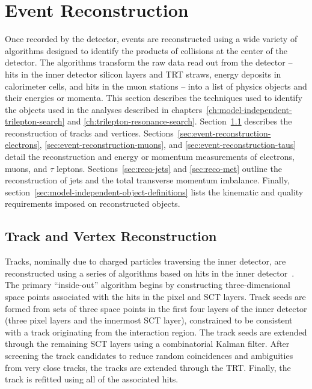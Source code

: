\chapter{Event Reconstruction}\label{ch:event-reconstruction}

Once recorded by the detector, events are reconstructed using a wide variety of algorithms designed to identify the products of collisions at the center of the detector. The algorithms transform the raw data read out from the detector -- hits in the inner detector silicon layers and TRT straws, energy deposits in calorimeter cells, and hits in the muon stations -- into a list of physics objects and their energies or momenta. This section describes the techniques used to identify the objects used in the analyses described in chapters~\ref{ch:model-independent-trilepton-search} and \ref{ch:trilepton-resonance-search}. Section~\ref{sec:event-reconstruction-track-vertex} describes the reconstruction of tracks and vertices. Sections~\ref{sec:event-reconstruction-electrons}, \ref{sec:event-reconstruction-muons}, and \ref{sec:event-reconstruction-taus} detail the reconstruction and energy or momentum measurements of electrons, muons, and $\tau$ leptons. Sections~\ref{sec:reco-jets} and \ref{sec:reco-met} outline the reconstruction of jets and the total transverse momentum imbalance. Finally, section~\ref{sec:model-independent-object-definitions} lists the kinematic and quality requirements imposed on reconstructed objects. 


\section{Track and Vertex Reconstruction}\label{sec:event-reconstruction-track-vertex}
Tracks, nominally due to charged particles traversing the inner detector, are reconstructed using a series of algorithms based on hits in the inner detector~\cite{Cornelissen:2007vba,TheATLASCollaboration:2010vw,TheATLASCollaboration:2012tja}.
The primary ``inside-out'' algorithm begins by constructing three-dimensional space points associated with the hits in the pixel and SCT layers. Track seeds are formed from sets of three space points in the first four layers of the inner detector (three pixel layers and the innermost SCT layer), constrained to be consistent with a track originating from the interaction region. The track seeds are extended through the remaining SCT layers using a combinatorial Kalman filter. After screening the track candidates to reduce random coincidences and ambiguities from very close tracks, the tracks are extended through the TRT. Finally, the track is refitted using all of the associated hits. 

